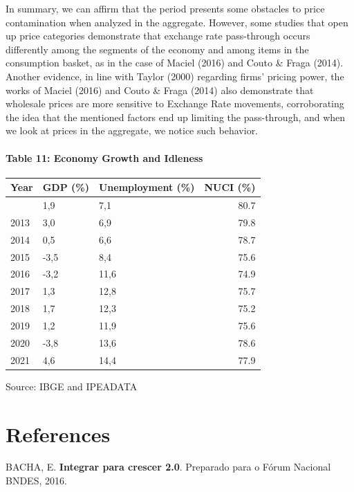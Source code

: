 \documentclass[12pt]{article}
\begin{document}
In summary, we can affirm that the period presents some obstacles to
price contamination when analyzed in the aggregate. However, some
studies that open up price categories demonstrate that exchange rate
pass-through occurs differently among the segments of the economy and
among items in the consumption basket, as in the case of Maciel (2016)
and Couto \& Fraga (2014). Another evidence, in line with Taylor (2000)
regarding firms' pricing power, the works of Maciel (2016) and Couto \&
Fraga (2014) also demonstrate that wholesale prices are more sensitive
to Exchange Rate movements, corroborating the idea that the mentioned
factors end up limiting the pass-through, and when we look at prices in
the aggregate, we notice such behavior.

\hypertarget{table-11-economy-growth-and-idleness}{%
\paragraph{Table 11: Economy Growth and
Idleness}\label{table-11-economy-growth-and-idleness}}

\begin{longtable}[]{@{}lllr@{}}
\toprule\noalign{}
Year & GDP (\%) & Unemployment (\%) & NUCI (\%) \\
\midrule\noalign{}
\endhead
\bottomrule\noalign{}
\endlastfoot
2012 & 1,9 & 7,1 & 80.7 \\
2013 & 3,0 & 6,9 & 79.8 \\
2014 & 0,5 & 6,6 & 78.7 \\
2015 & -3,5 & 8,4 & 75.6 \\
2016 & -3,2 & 11,6 & 74.9 \\
2017 & 1,3 & 12,8 & 75.7 \\
2018 & 1,7 & 12,3 & 75.2 \\
2019 & 1,2 & 11,9 & 75.6 \\
2020 & -3,8 & 13,6 & 78.6 \\
2021 & 4,6 & 14,4 & 77.9 \\
\end{longtable}

Source: IBGE and IPEADATA

\hypertarget{references}{%
\section{References}\label{references}}

BACHA, E. \textbf{Integrar para crescer 2.0}. Preparado para o Fórum
Nacional BNDES, 2016.
\end{document}
